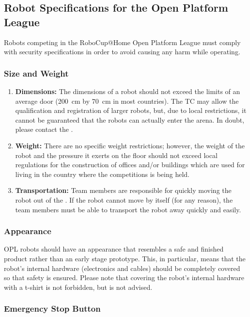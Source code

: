 \subsection{Robot Specifications for the Open Platform League }
Robots competing in the RoboCup@Home Open Platform League must comply with security specifications in order to avoid causing any harm while operating.

\subsubsection{Size and Weight}
\label{rule:robots_size}

\begin{enumerate}
	\item \textbf{Dimensions:} The dimensions of a robot should not exceed the limits of an average door (\SI{200}{\centi\meter} by \SI{70}{\centi\meter} in most countries).
	The TC may allow the qualification and registration of larger robots, but, due to local restrictions, it cannot be guaranteed that the robots can actually enter the arena.
	In doubt, please contact the \LOC.
	\item \textbf{Weight:} There are no specific weight restrictions; however, the weight of the robot and the pressure it exerts on the floor should not exceed local regulations for the construction of offices and/or buildings which are used for living in the country where the competitions is being held.
	\item \textbf{Transportation:} Team members are responsible for quickly moving the robot out of the \Arena.
	If the robot cannot move by itself (for any reason), the team members must be able to transport the robot away quickly and easily.
\end{enumerate}

\subsubsection{Appearance}
\label{rule:robots_appearance}

OPL robots should have an appearance that resembles a safe and finished product rather than an early stage prototype.
This, in particular, means that the robot's internal hardware (electronics and cables) should be completely covered so that safety is ensured.
Please note that covering the robot's internal hardware with a t-shirt is not forbidden, but is not advised.

\subsubsection{Emergency Stop Button}
\label{rule:robots_emergency_button}

